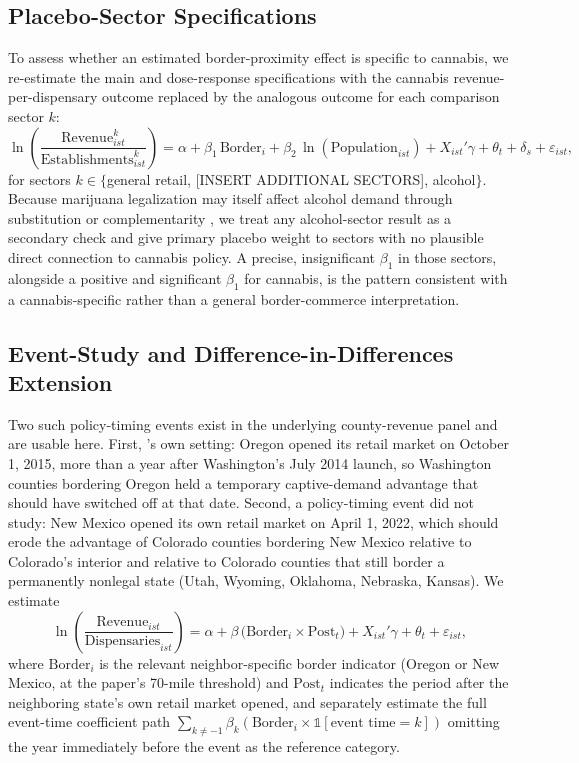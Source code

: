 \documentclass[12pt]{article}
\begin{document}
\subsection{Placebo-Sector Specifications}
To assess whether an estimated border-proximity effect is specific to cannabis, we re-estimate the main and
dose-response specifications with the cannabis revenue-per-dispensary outcome replaced by the analogous
outcome for each comparison sector $k$:
\begin{equation}
\ln\left(\frac{\text{Revenue}^k_{ist}}{\text{Establishments}^k_{ist}}\right) =
\alpha + \beta_1\, \text{Border}_i + \beta_2\, \ln(\text{Population}_{ist}) + X_{ist}'\gamma +
\theta_t + \delta_s + \varepsilon_{ist},
\end{equation}
for sectors $k \in \{$general retail, [INSERT ADDITIONAL SECTORS], alcohol$\}$. Because marijuana
legalization may itself affect alcohol demand through substitution or complementarity
\citep{BaggioChongKwon2020}, we treat any alcohol-sector result as a secondary check and give primary
placebo weight to sectors with no plausible direct connection to cannabis policy. A precise, insignificant
$\beta_1$ in those sectors, alongside a positive and significant $\beta_1$ for cannabis, is the pattern
consistent with a cannabis-specific rather than a general border-commerce interpretation.

\subsection{Event-Study and Difference-in-Differences Extension}
\label{sec:eventstudy_diD}
Two such policy-timing events exist in the underlying county-revenue panel and are usable here. First,
\citet{HansenMillerWeber2020}'s own setting: Oregon opened its retail market on October 1, 2015, more than
a year after Washington's July 2014 launch, so Washington counties bordering Oregon held a temporary
captive-demand advantage that should have switched off at that date. Second, a policy-timing event
\citeauthor{HansenMillerWeber2020} did not study: New Mexico opened its own retail market on April 1, 2022,
which should erode the advantage of Colorado counties bordering New Mexico relative to Colorado's interior
and relative to Colorado counties that still border a permanently nonlegal state (Utah, Wyoming, Oklahoma,
Nebraska, Kansas). We estimate
\begin{equation}
\ln\left(\frac{\text{Revenue}_{ist}}{\text{Dispensaries}_{ist}}\right) =
\alpha + \beta\, \big(\text{Border}_i \times \text{Post}_t\big) +
X_{ist}'\gamma + \theta_t + \varepsilon_{ist},
\end{equation}
where $\text{Border}_i$ is the relevant neighbor-specific border indicator (Oregon or New Mexico, at the
paper's 70-mile threshold) and $\text{Post}_t$ indicates the period after the neighboring state's own
retail market opened, and separately estimate the full event-time coefficient path
$\sum_{k\neq -1}\beta_k(\text{Border}_i\times\mathbb{1}[\text{event time}=k])$ omitting the year immediately
before the event as the reference category.
\end{document}
